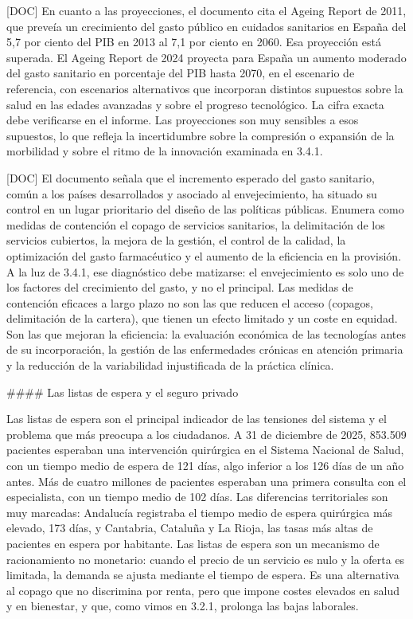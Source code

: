 \documentclass[10pt,a4paper]{article}
\begin{document}
[DOC] En cuanto a las proyecciones, el documento cita el Ageing Report de 2011, que preveía un crecimiento del gasto público en cuidados sanitarios en España del 5,7 por ciento del PIB en 2013 al 7,1 por ciento en 2060. Esa proyección está superada. El Ageing Report de 2024 proyecta para España un aumento moderado del gasto sanitario en porcentaje del PIB hasta 2070, en el escenario de referencia, con escenarios alternativos que incorporan distintos supuestos sobre la salud en las edades avanzadas y sobre el progreso tecnológico. La cifra exacta debe verificarse en el informe. Las proyecciones son muy sensibles a esos supuestos, lo que refleja la incertidumbre sobre la compresión o expansión de la morbilidad y sobre el ritmo de la innovación examinada en 3.4.1.

[DOC] El documento señala que el incremento esperado del gasto sanitario, común a los países desarrollados y asociado al envejecimiento, ha situado su control en un lugar prioritario del diseño de las políticas públicas. Enumera como medidas de contención el copago de servicios sanitarios, la delimitación de los servicios cubiertos, la mejora de la gestión, el control de la calidad, la optimización del gasto farmacéutico y el aumento de la eficiencia en la provisión. A la luz de 3.4.1, ese diagnóstico debe matizarse: el envejecimiento es solo uno de los factores del crecimiento del gasto, y no el principal. Las medidas de contención eficaces a largo plazo no son las que reducen el acceso (copagos, delimitación de la cartera), que tienen un efecto limitado y un coste en equidad. Son las que mejoran la eficiencia: la evaluación económica de las tecnologías antes de su incorporación, la gestión de las enfermedades crónicas en atención primaria y la reducción de la variabilidad injustificada de la práctica clínica.

#### Las listas de espera y el seguro privado

Las listas de espera son el principal indicador de las tensiones del sistema y el problema que más preocupa a los ciudadanos. A 31 de diciembre de 2025, 853.509 pacientes esperaban una intervención quirúrgica en el Sistema Nacional de Salud, con un tiempo medio de espera de 121 días, algo inferior a los 126 días de un año antes. Más de cuatro millones de pacientes esperaban una primera consulta con el especialista, con un tiempo medio de 102 días. Las diferencias territoriales son muy marcadas: Andalucía registraba el tiempo medio de espera quirúrgica más elevado, 173 días, y Cantabria, Cataluña y La Rioja, las tasas más altas de pacientes en espera por habitante. Las listas de espera son un mecanismo de racionamiento no monetario: cuando el precio de un servicio es nulo y la oferta es limitada, la demanda se ajusta mediante el tiempo de espera. Es una alternativa al copago que no discrimina por renta, pero que impone costes elevados en salud y en bienestar, y que, como vimos en 3.2.1, prolonga las bajas laborales.
\end{document}

